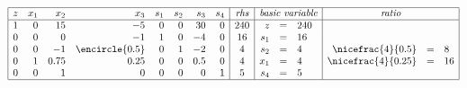 \begin{center}
	\label{tab:tabel_pivotting_2}
	$
	\begin{array}{|r r r r r r r r|c|r c l|r c l|}
		\hline
		z & x_1 & x_2 & x_3 & s_1 & s_2 & s_3 & s_4 & \textit{rhs} & \multicolumn{3}{c|}{\textit{basic variable}} & \multicolumn{3}{c|}{\textit{ratio}}\\
		\hline
		1 & 0 & 15 & -5 & 0 & 0 & 30 & 0 & 240 & z & = & 240 &&&\\
		0 & 0 & 0 & -1 & 1 & 0 & -4 & 0 & 16 & s_1 & = & 16 &&&\\
		0 & 0 & -1 & \encircle{0.5} & 0 & 1 & -2 & 0 & 4 & s_2 & = & 4 & \nicefrac{4}{0.5} & = & 8\\
		0 & 1 & 0.75 & 0.25 & 0 & 0 & 0.5 & 0 & 4 & x_1 & = & 4 & \nicefrac{4}{0.25} & = & 16\\
		0 & 0 & 1 & 0 & 0 & 0 & 0 & 1 & 5 & s_4 & = & 5 &&&\\
		\hline
	\end{array}
	$
\end{center}

